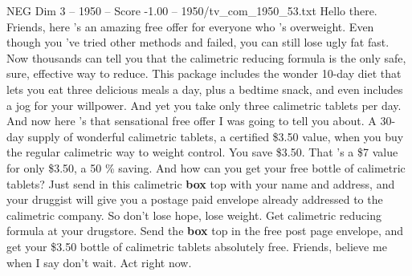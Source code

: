 \begin{textsample}{NEG Dim 3 – 1950 – Score -1.00 – 1950/tv\_com\_1950\_53.txt}  \label{ex:f3_neg_089}
Hello there.
Friends, here 's an amazing free offer for everyone who 's overweight.
Even though you 've tried other methods and failed, you can still lose ugly fat fast.
Now thousands can tell you that the calimetric reducing formula is the only safe, sure, effective way to reduce.
This package includes the wonder 10-day diet that lets you eat three delicious meals a day, plus a bedtime snack, and even includes a jog for your willpower.
And yet you take only three calimetric tablets per day.
And now here 's that sensational free offer I was going to tell you about.
A 30-day supply of wonderful calimetric tablets, a certified \$3.50 value, when you buy the regular calimetric way to weight control.
You save \$3.50.
That 's a \$7 value for only \$3.50, a 50 \% saving.
And how can you get your free bottle of calimetric tablets?
Just send in this calimetric \textbf{box} top with your name and address, and your druggist will give you a postage paid envelope already addressed to the calimetric company.
So don't lose hope, lose weight.
Get calimetric reducing formula at your drugstore.
Send the \textbf{box} top in the free post page envelope, and get your \$3.50 bottle of calimetric tablets absolutely free.
Friends, believe me when I say don't wait.
Act right now.

\end{textsample}
